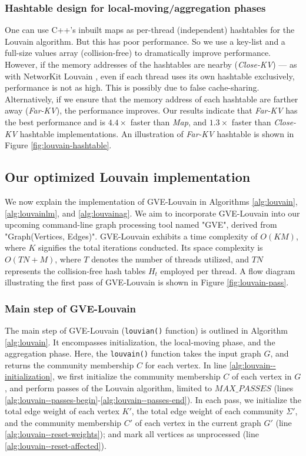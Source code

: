 \subsubsection{Hashtable design for local-moving/aggregation phases}

One can use C++'s inbuilt maps as per-thread (independent) hashtables for the Louvain algorithm. But this has poor performance. So we use a key-list and a full-size values array (collision-free) to dramatically improve performance. However, if the memory addresses of the hashtables are nearby (\textit{Close-KV}) --- as with NetworKit Louvain \cite{staudt2016networkit}, even if each thread uses its own hashtable exclusively, performance is not as high. This is possibly due to false cache-sharing. Alternatively, if we ensure that the memory address of each hashtable are farther away (\textit{Far-KV}), the performance improves. Our results indicate that \textit{Far-KV} has the best performance and is $4.4\times$ faster than \textit{Map}, and $1.3\times$ faster than \textit{Close-KV} hashtable implementations. An illustration of \textit{Far-KV} hashtable is shown in Figure \ref{fig:louvain-hashtable}.




\subsection{Our optimized Louvain implementation}

We now explain the implementation of GVE-Louvain in Algorithms \ref{alg:louvain}, \ref{alg:louvainlm}, and \ref{alg:louvainag}. We aim to incorporate GVE-Louvain into our upcoming command-line graph processing tool named "GVE", derived from "Graph(Vertices, Edges)". GVE-Louvain exhibits a time complexity of $O(KM)$, where $K$ signifies the total iterations conducted. Its space complexity is $O(TN + M)$, where $T$ denotes the number of threads utilized, and $TN$ represents the collision-free hash tables $H_t$ employed per thread. A flow diagram illustrating the first pass of GVE-Louvain is shown in Figure \ref{fig:louvain-pass}.


\subsubsection{Main step of GVE-Louvain}

The main step of GVE-Louvain (\texttt{louvian()} function) is outlined in Algorithm \ref{alg:louvain}. It encompasses initialization, the local-moving phase, and the aggregation phase. Here, the \texttt{louvain()} function takes the input graph $G$, and returns the community membership $C$ for each vertex. In line \ref{alg:louvain--initialization}, we first initialize the community membership $C$ of each vertex in $G$, and perform passes of the Louvain algorithm, limited to $MAX\_PASSES$ (lines \ref{alg:louvain--passes-begin}-\ref{alg:louvain--passes-end}). In each pass, we initialize the total edge weight of each vertex $K'$, the total edge weight of each community $\Sigma'$, and the community membership $C'$ of each vertex in the current graph $G'$ (line \ref{alg:louvain--reset-weights}); and mark all vertices as unprocessed (line \ref{alg:louvain--reset-affected}).

